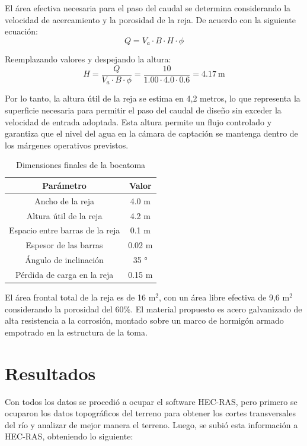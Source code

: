 \documentclass{article} %
\begin{document}
El área efectiva necesaria para el paso del caudal se determina considerando la velocidad de acercamiento y la porosidad de la reja. De acuerdo con la siguiente ecuación:
\begin{equation}
    Q = V_a \cdot B \cdot H \cdot \phi
\end{equation}

Reemplazando valores y despejando la altura:
\begin{equation}
    H = \frac{Q}{V_a \cdot B \cdot \phi} = \frac{10}{1.00 \cdot 4.0 \cdot 0.6} = 4.17 \ \text{m}
\end{equation}

Por lo tanto, la altura útil de la reja se estima en 4,2 metros, lo que representa la superficie necesaria para permitir el paso del caudal de diseño sin exceder la velocidad de entrada adoptada. Esta altura permite un flujo controlado y garantiza que el nivel del agua en la cámara de captación se mantenga dentro de los márgenes operativos previstos.

\begin{table}[h]
    \centering
    \begin{tabular}{c c}
        \textbf{Parámetro} & \textbf{Valor} \\
        \hline
        Ancho de la reja & 4.0 m \\
        Altura útil de la reja & 4.2 m \\ 
        Espacio entre barras de la reja & 0.1 m \\
        Espesor de las barras & 0.02 m \\
        Ángulo de inclinación & 35 ° \\
        Pérdida de carga en la reja & 0.15 m \\ \hline
    \end{tabular}
    \caption{Dimensiones finales de la bocatoma}
\end{table}

El área frontal total de la reja es de 16 m$^2$, con un área libre efectiva de 9,6 m$^2$ considerando la porosidad del 60\%. El material propuesto es acero galvanizado de alta resistencia a la corrosión, montado sobre un marco de hormigón armado empotrado en la estructura de la toma.

\newpage
\section{Resultados}

Con todos los datos se procedió a ocupar el software HEC-RAS, pero primero se ocuparon los datos topográficos del terreno para obtener los cortes transversales del río y analizar de mejor manera el terreno. Luego, se subió esta información a HEC-RAS, obteniendo lo siguiente:
\end{document}
